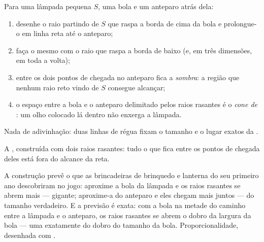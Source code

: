 \begin{method}\label{met:g6:light-propagation:shadow}
Para uma lâmpada pequena $S$, uma bola e um anteparo atrás dela:
\begin{enumerate}
  \item desenhe o raio partindo de $S$ que raspa a borda de cima da
        bola e prolongue-o em linha reta até o anteparo;
  \item faça o mesmo com o raio que raspa a borda de baixo (e, em
        três dimensões, em toda a volta);
  \item entre os dois pontos de chegada no anteparo fica a
        \emph{sombra}: a região que nenhum raio reto
        vindo de $S$ consegue alcançar;
  \item o espaço entre a bola e o anteparo delimitado pelos raios
        rasantes é o \emph{cone de }: um olho colocado lá
        dentro não enxerga a lâmpada.
\end{enumerate}
Nada de adivinhação: duas linhas de régua fixam o tamanho e o lugar
exatos da .
\end{method}

\begin{omfigure}

{\small A , construída com dois raios rasantes: tudo o que fica
entre os pontos de chegada deles está fora do alcance da  reta.}
\end{omfigure}

\begin{example}\label{ex:g6:light-propagation:sizes}
A construção prevê o que as brincadeiras de brinquedo e lanterna do
seu primeiro ano descobriram no jogo: aproxime a bola da lâmpada e os
raios rasantes se abrem mais ---  gigante; aproxime-a do
anteparo e eles chegam mais juntos ---  do tamanho verdadeiro.
E a previsão é exata: com a bola na metade do caminho entre a lâmpada
e o anteparo, os raios rasantes se abrem o dobro da largura da bola
--- uma  exatamente do dobro do tamanho da bola.
Proporcionalidade, desenhada com .
\end{example}

